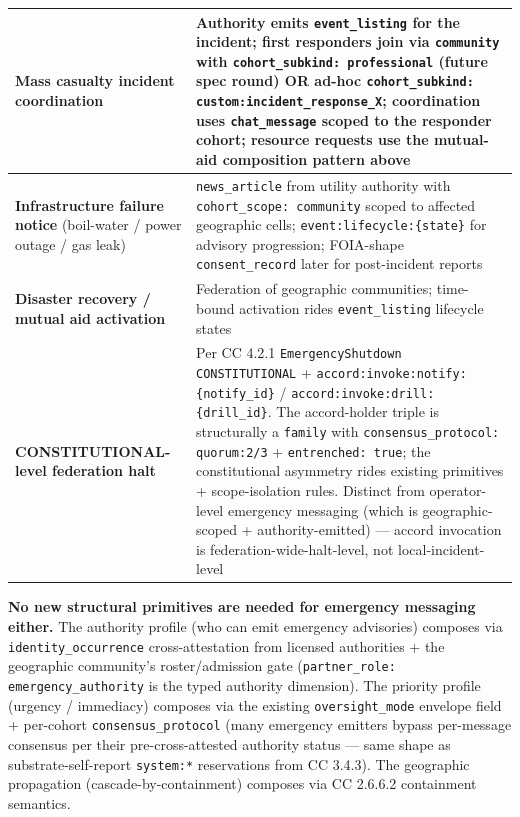 \documentclass[11pt]{article}
\begin{document}
{\begin{longtable}{|p{8.0cm}|p{8.0cm}|}
\textbf{Mass casualty incident coordination} & Authority emits \texttt{event\_listing} for the incident; first responders join via \texttt{community} with \texttt{cohort\_subkind: professional} (future spec round) OR ad-hoc \texttt{cohort\_subkind: custom:incident\_response\_X}; coordination uses \texttt{chat\_message} scoped to the responder cohort; resource requests use the mutual-aid composition pattern above \\ \hline
\textbf{Infrastructure failure notice} (boil-water / power outage / gas leak) & \texttt{news\_article} from utility authority with \texttt{cohort\_scope: community} scoped to affected geographic cells; \texttt{event:lifecycle:\{state\}} for advisory progression; FOIA-shape \texttt{consent\_record} later for post-incident reports \\ \hline
\textbf{Disaster recovery / mutual aid activation} & Federation of geographic communities; time-bound activation rides \texttt{event\_listing} lifecycle states \\ \hline
\textbf{CONSTITUTIONAL-level federation halt} & Per CC 4.2.1 \texttt{EmergencyShutdown CONSTITUTIONAL} + \texttt{accord:invoke:notify:\{notify\_id\}} / \texttt{accord:invoke:drill:\{drill\_id\}}. The accord-holder triple is structurally a \texttt{family} with \texttt{consensus\_protocol: quorum:2/3} + \texttt{entrenched: true}; the constitutional asymmetry rides existing primitives + scope-isolation rules. Distinct from operator-level emergency messaging (which is geographic-scoped + authority-emitted) — accord invocation is federation-wide-halt-level, not local-incident-level \\ \hline
\end{longtable}}


\textbf{No new structural primitives are needed for emergency messaging either.} The authority profile (who can emit emergency advisories) composes via \texttt{identity\_occurrence} cross-attestation from licensed authorities + the geographic community's roster/admission gate (\texttt{partner\_role: emergency\_authority} is the typed authority dimension). The priority profile (urgency / immediacy) composes via the existing \texttt{oversight\_mode} envelope field + per-cohort \texttt{consensus\_protocol} (many emergency emitters bypass per-message consensus per their pre-cross-attested authority status — same shape as substrate-self-report \texttt{system:*} reservations from CC 3.4.3). The geographic propagation (cascade-by-containment) composes via CC 2.6.6.2 containment semantics.
\end{document}
